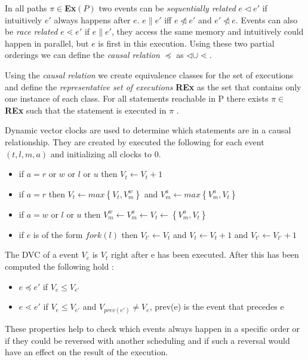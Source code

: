 \documentclass[10pt]{llncs}
\begin{document}
In all paths $\pi \in $\textbf{Ex}$(P)$ two events can be \emph{sequentially related} $e \triangleleft e'$ if intuitively $e'$ always happens after $e$. $e \parallel e'$ iff $e \ntriangleleft e'$ and $e' \ntriangleleft e$. Events can also be \emph{race related} $e \lessdot e'$ if $e \parallel e'$, they access the same memory and intuitively could happen in parallel, but $e$ is first in this execution. Using these two partial orderings we can define the \emph{causal relation} $\preceq$ as $\triangleleft \cup \lessdot$.

Using the \emph{causal relation} we create equivalence classes for the set of executions and define the \emph{representative set of executions} \textbf{REx} as the set that contains only one instance of each class. For all statements reachable in P there exists $\pi \in$ \textbf{REx} such that the statement is executed in $\pi$ \cite[§4]{base4}.

Dynamic vector clocks are used to determine which statements are in a causal relationship. They are created by executed the following for each event $(t, l, m, a)$ and initializing all clocks to $0$.

\begin{itemize}
	\item if $a = r$ or $w$ or $l$ or $u$ then $V_t \leftarrow V_t + 1$
	\item if $a = r$ then $V_t \leftarrow max \left\lbrace V_t, V_m^w \right\rbrace$ and $V_m^a \leftarrow max \left\lbrace V_m^a, V_t \right\rbrace$
	\item  if $a = w$ or $l$ or $u$ then $V_m^w \leftarrow V_m^a \leftarrow V_t \leftarrow \left\lbrace V_m^a, V_t \right\rbrace$
	\item if $e$ is of the form $fork(l)$ then $V_{t'} \leftarrow V_t$ and $V_t \leftarrow V_t + 1$ and $V_{t'} \leftarrow V_{t'} + 1$
\end{itemize}

The DVC of a event $V_e$ is $V_t$ right after e has been executed. After this has been computed the following hold \cite[§4]{base4}:

\begin{itemize}
	\item $e \preceq e'$ if $V_e \leq V_{e'}$
	\item $e \lessdot e'$ if $V_e \leq V_{e'}$ and $V_{prev(e')} \neq V_e$, prev(e) is the event that precedes e
\end{itemize}

These properties help to check which events always happen in a specific order or if they could be reversed with another scheduling and if such a reversal would have an effect on the result of the execution.
\end{document}

